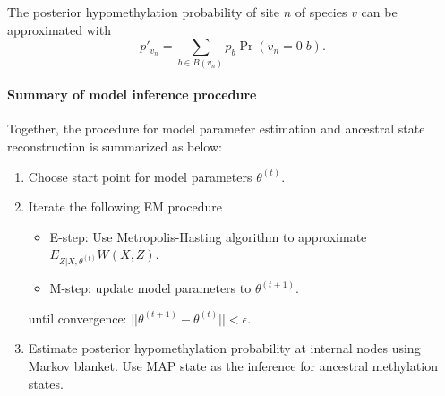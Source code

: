 \documentclass[11pt]{article}
\theoremstyle{theorem}
\theoremstyle{proposition}
\begin{document}
The posterior hypomethylation probability of site $n$ of species $v$
can be approximated with
\[
p'_{v_{n}} = \sum_{b\in B(v_n)}p_{b}\Pr(v_{n} = 0| b).
\]

\paragraph{Summary of model inference procedure}
Together, the procedure for model parameter estimation and
ancestral state reconstruction is summarized as below:
\begin{enumerate}
\item Choose start point for model parameters $\theta^{(t)}$.
\item Iterate the following EM procedure
  \begin{itemize}
  \item E-step: Use Metropolis-Hasting algorithm to approximate
    $E_{Z|X,\theta^{(t)}}W(X,Z)$.
  \item M-step: update model parameters to $\theta^{(t+1)}$.
  \end{itemize}
  until convergence: $||\theta^{(t+1)}-\theta^{(t)}|| <
  \epsilon$.
\item Estimate posterior hypomethylation probability at internal nodes
  using Markov blanket. Use MAP state as the inference for ancestral
  methylation states.
\end{enumerate}


\newpage



\end{document}
